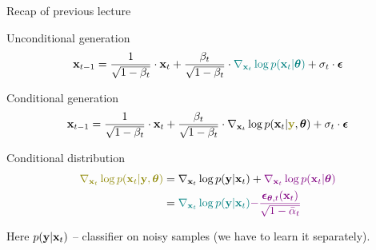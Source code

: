 \begin{frame}{Recap of previous lecture}
	\begin{block}{Unconditional generation}
		\vspace{-0.3cm}
		\[
			\mathbf{x}_{t - 1} = \frac{1}{\sqrt{1 - \beta_t}} \cdot \mathbf{x}_t + \frac{\beta_t}{\sqrt{1 - \beta_t}} \cdot {\color{teal} \nabla_{\mathbf{x}_t} \log p(\mathbf{x}_t | \boldsymbol{\theta})} +  \sigma_t \cdot \boldsymbol{\epsilon}
		\]
		\vspace{-0.5cm}
	\end{block}
	\begin{block}{Conditional generation}
		\vspace{-0.5cm}
		\[
			\bx_{t - 1} =  \frac{1}{\sqrt{1 - \beta_t}}\cdot \bx_t +  \frac{\beta_t}{\sqrt{1 - \beta_t}}  \cdot  \nabla_{\bx_t} \log p(\bx_t | {\color{olive}\by}, \btheta) +  \sigma_t \cdot \bepsilon
		\]
		\vspace{-0.5cm}
	\end{block}
	\begin{block}{Conditional distribution}
		\vspace{-0.5cm}
		\begin{align*}
			{\color{olive}\nabla_{\bx_t} \log p(\bx_t | \by, \btheta)} &= \nabla_{\bx_t} \log p(\by | \bx_t) + {\color{violet}\nabla_{\bx_t} \log p(\bx_t | \btheta)}\\
			&= {\color{teal}\nabla_{\bx_t} \log p(\by | \bx_t)} {\color{violet}- \frac{\bepsilon_{\btheta, t}(\bx_t)}{\sqrt{1 - \bar{\alpha}_t}}}
		\end{align*}
		\vspace{-0.5cm}
	\end{block}
	Here $p(\mathbf{y} | \mathbf{x}_t)$ -- classifier on noisy samples (we have to learn it separately).
\end{frame}
